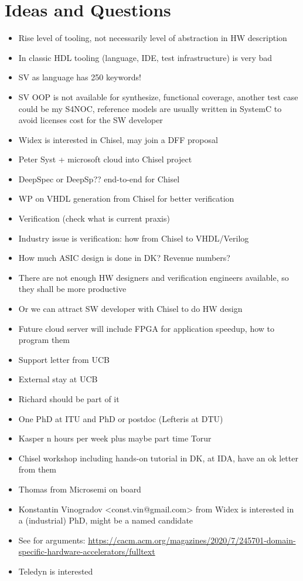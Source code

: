 \documentclass[fleqn,12pt]{article}
\begin{document}
\section{Ideas and Questions}

\begin{itemize}
\item Rise level of tooling, not necessarily level of abstraction in HW description
\item In classic HDL tooling (language, IDE, test infrastructure) is very bad
\item SV as language has 250 keywords!
\item SV OOP is not available for synthesize, functional coverage, another test case could be my S4NOC, reference models are usually written in SystemC to avoid licenses cost for the SW developer
\item Widex is interested in Chisel, may join a DFF proposal
\item Peter Syst + microsoft cloud into Chisel project
\item DeepSpec or DeepSp?? end-to-end for Chisel
\item WP on VHDL generation from Chisel for better verification
\item Verification (check what is current praxis)
\item Industry issue is verification: how from Chisel to VHDL/Verilog
\item How much ASIC design is done in DK? Revenue numbers?
\item There are not enough HW designers and verification engineers available, so they shall be more productive
\item Or we can attract SW developer with Chisel to do HW design
\item Future cloud server will include FPGA for application speedup, how to program them
\item Support letter from UCB
\item External stay at UCB
\item Richard should be part of it
\item One PhD at ITU and PhD or postdoc (Lefteris at DTU)
\item Kasper n hours per week plus maybe part time Torur
\item Chisel workshop including hands-on tutorial in DK, at IDA, have an ok letter from them
\item Thomas from Microsemi on board
\item Konstantin Vinogradov <const.vin@gmail.com> from Widex is interested in a (industrial) PhD, might be a named candidate
\item See for arguments: \url{https://cacm.acm.org/magazines/2020/7/245701-domain-specific-hardware-accelerators/fulltext}
\item Teledyn is interested
\end{itemize}
\end{document}
